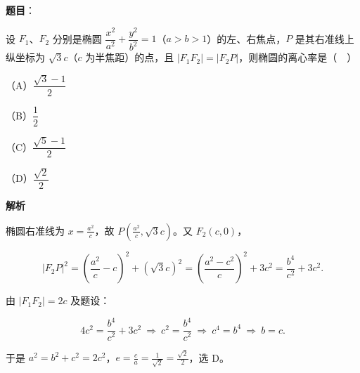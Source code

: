 \begin{answer}

\textbf{题目}：

设 $F_1$、$F_2$ 分别是椭圆 $\dfrac{x^2}{a^2}+\dfrac{y^2}{b^2}=1$（$a>b>1$）的左、右焦点，$P$ 是其右准线上纵坐标为 $\sqrt3c$（$c$ 为半焦距）的点，且 $|F_1F_2|=|F_2P|$，则椭圆的离心率是（　）

（A）$\dfrac{\sqrt3-1}{2}$

（B）$\dfrac12$

（C）$\dfrac{\sqrt5-1}{2}$

（D）$\dfrac{\sqrt2}{2}$

\textbf{解析}

椭圆右准线为 $x=\frac{a^2}{c}$，故 $P\left(\frac{a^2}{c},\sqrt3c\right)$。又 $F_2(c,0)$，

\nopagebreak[4]
\[|F_2P|^2=\left(\frac{a^2}{c}-c\right)^2+(\sqrt3c)^2=\left(\frac{a^2-c^2}{c}\right)^2+3c^2=\frac{b^4}{c^2}+3c^2 .\]

由 $|F_1F_2|=2c$ 及题设：

\nopagebreak[4]
\[4c^2=\frac{b^4}{c^2}+3c^2\ \Longrightarrow\ c^2=\frac{b^4}{c^2}\ \Longrightarrow\ c^4=b^4\ \Longrightarrow\ b=c .\]

于是 $a^2=b^2+c^2=2c^2$，$e=\frac ca=\frac{1}{\sqrt2}=\frac{\sqrt2}{2}$，选 D。


\end{answer}
